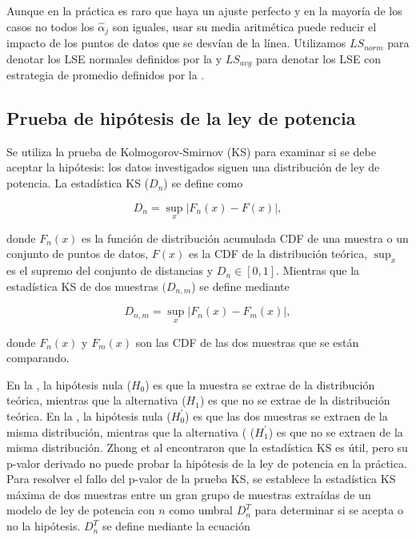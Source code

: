 Aunque en la práctica es raro que haya un ajuste perfecto y en la mayoría de los casos no todos los $\hat{\alpha}_j$ son iguales, usar su media aritmética puede reducir el impacto de los puntos de datos que se desvían de la línea. Utilizamos $LS_{norm}$ para denotar los LSE normales definidos por la  y $LS_{avg}$ para denotar los LSE con estrategia de promedio definidos por la  . 


\subsection{Prueba de hipótesis de la ley de potencia}

Se utiliza la prueba de Kolmogorov-Smirnov (KS)   para examinar si se debe aceptar la hipótesis: los datos investigados siguen una distribución de ley de potencia. La estadística KS ($D_n$) se define como

\begin{equation}\label{eq:96}
	D_n=\underset{x}{\sup}\left| F_n(x)-F(x)\right|,
\end{equation}

donde $F_n( x)$ es la función de distribución acumulada \gls{CDF} de una muestra o un conjunto de puntos de datos, $F( x)$ es la \gls{CDF} de la distribución teórica, $\sup_x$ es el supremo del conjunto de distancias y $D_n \in [0, 1]$. Mientras que la estadística \gls{KS} de dos muestras $(D_{n, m}$) se define mediante

\begin{equation}\label{eq:97}
	D_{n,m}=\underset{x}{\sup}\left| F_n(x)-F_m(x)\right|,
\end{equation}

donde $F_n(x)$ y $F_m(x)$ son las \gls{CDF} de las dos muestras que se están comparando. 

En la , la hipótesis nula ($H_0$) es que la muestra se extrae de la distribución teórica, mientras que la alternativa ($H_1$) es que no se extrae de la distribución teórica. En la , la hipótesis nula ($H^{\prime}_0$)  es que las dos muestras se extraen de la misma distribución, mientras que la alternativa (
($H^{\prime}_1$) es que no se extraen de la misma distribución. Zhong et al \cite{zhong_is_2022} encontraron  que la estadística KS es útil, pero su p-valor derivado no puede probar la hipótesis de la ley de potencia en la práctica.  Para resolver el fallo del p-valor de la prueba KS, se establece la estadística KS máxima de dos muestras entre un gran grupo de muestras extraídas de un modelo de ley de potencia con $n$ como umbral $D^T_n$ para determinar si se acepta o no la hipótesis. $D^T_n$ se define mediante la ecuación

